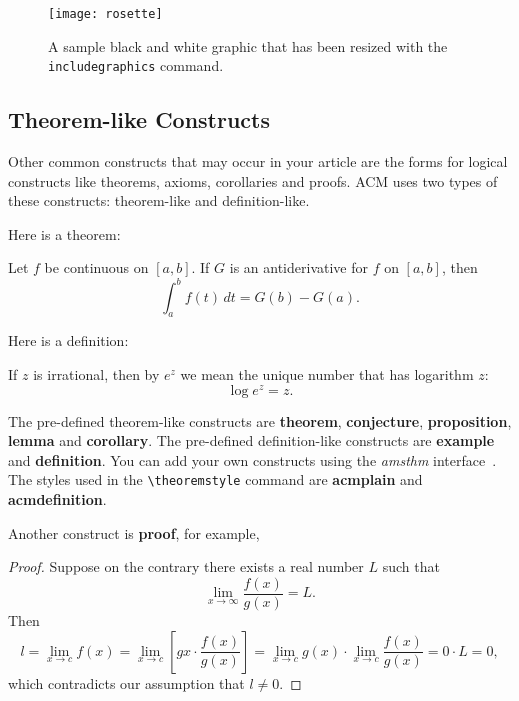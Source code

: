 \begin{figure}
\texttt{[image: rosette]}
\caption{A sample black and white graphic that has
been resized with the \texttt{includegraphics} command.}
\end{figure}

\subsection{Theorem-like Constructs}

Other common constructs that may occur in your article are the forms
for logical constructs like theorems, axioms, corollaries and proofs.
ACM uses two types of these constructs:  theorem-like and
definition-like.

Here is a theorem:
\begin{theorem}
  Let $f$ be continuous on $[a,b]$.  If $G$ is
  an antiderivative for $f$ on $[a,b]$, then
  \begin{displaymath}
    \int^b_af(t)\,dt = G(b) - G(a).
  \end{displaymath}
\end{theorem}

Here is a definition:
\begin{definition}
  If $z$ is irrational, then by $e^z$ we mean the
  unique number that has
  logarithm $z$:
  \begin{displaymath}
    \log e^z = z.
  \end{displaymath}
\end{definition}

The pre-defined theorem-like constructs are \textbf{theorem},
\textbf{conjecture}, \textbf{proposition}, \textbf{lemma} and
\textbf{corollary}.  The pre-defined de\-fi\-ni\-ti\-on-like constructs are
\textbf{example} and \textbf{definition}.  You can add your own
constructs using the \textsl{amsthm} interface~\cite{Amsthm15}.  The
styles used in the \verb|\theoremstyle| command are \textbf{acmplain}
and \textbf{acmdefinition}.

Another construct is \textbf{proof}, for example,

\begin{proof}
  Suppose on the contrary there exists a real number $L$ such that
  \begin{displaymath}
    \lim_{x\rightarrow\infty} \frac{f(x)}{g(x)} = L.
  \end{displaymath}
  Then
  \begin{displaymath}
    l=\lim_{x\rightarrow c} f(x)
    = \lim_{x\rightarrow c}
    \left[ g{x} \cdot \frac{f(x)}{g(x)} \right ]
    = \lim_{x\rightarrow c} g(x) \cdot \lim_{x\rightarrow c}
    \frac{f(x)}{g(x)} = 0\cdot L = 0,
  \end{displaymath}
  which contradicts our assumption that $l\neq 0$.
\end{proof}

